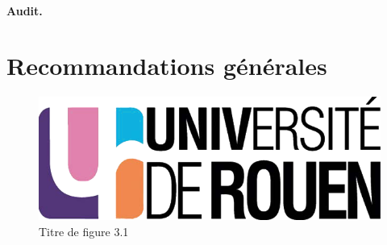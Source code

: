 		
		
		\paragraph{Audit.\\}




\section{Recommandations générales}




\begin{figure}[H]
	\centering
	\includegraphics[scale=0.2]{images/logo_univ.png}
	\caption{Titre de figure 3.1}
	\label{fi31}
\end{figure}